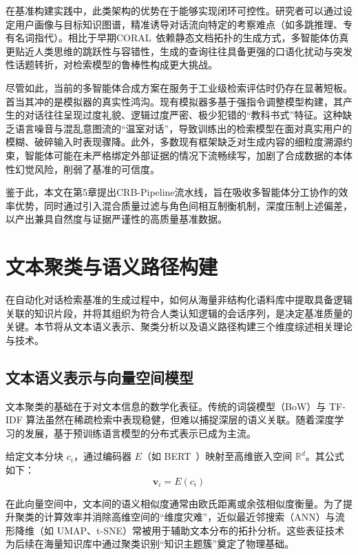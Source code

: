 在基准构建实践中，此类架构的优势在于能够实现闭环可控性。研究者可以通过设定用户画像与目标知识图谱，精准诱导对话流向特定的考察难点（如多跳推理、专有名词指代）。相比于早期CORAL~\citep{coral2025}依赖静态文档拓扑的生成方式，多智能体仿真更贴近人类思维的跳跃性与容错性，生成的查询往往具备更强的口语化扰动与突发性话题转折，对检索模型的鲁棒性构成更大挑战。

尽管如此，当前的多智能体合成方案在服务于工业级检索评估时仍存在显著短板。首当其冲的是模拟器的真实性鸿沟。现有模拟器多基于强指令调整模型构建，其产生的对话往往呈现过度礼貌、逻辑过度严密、极少犯错的“教科书式”特征。这种缺乏语言噪音与混乱意图流的“温室对话”，导致训练出的检索模型在面对真实用户的模糊、破碎输入时表现骤降。此外，多数现有框架缺乏对生成内容的细粒度溯源约束，智能体可能在未严格绑定外部证据的情况下流畅续写，加剧了合成数据的本体性幻觉风险，削弱了基准的可信度。

鉴于此，本文在第5章提出CRB-Pipeline流水线，旨在吸收多智能体分工协作的效率优势，同时通过引入混合质量过滤与角色间相互制衡机制，深度压制上述偏差，以产出兼具自然度与证据严谨性的高质量基准数据。



\section{文本聚类与语义路径构建}

在自动化对话检索基准的生成过程中，如何从海量非结构化语料库中提取具备逻辑关联的知识片段，并将其组织为符合人类认知逻辑的会话序列，是决定基准质量的关键。本节将从文本语义表示、聚类分析以及语义路径构建三个维度综述相关理论与技术。

\subsection{文本语义表示与向量空间模型}

文本聚类的基础在于对文本信息的数学化表征。传统的词袋模型（BoW）与 TF-IDF 算法虽然在稀疏检索中表现稳健，但难以捕捉深层的语义关联。随着深度学习的发展，基于预训练语言模型的分布式表示已成为主流。

给定文本分块 $c_i$，通过编码器 $E$（如 BERT~\citep{devlin2019bert}）映射至高维嵌入空间 $\mathbb{R}^d$。其公式如下：
\begin{equation}
    \mathbf{v}_i = E(c_i)
\end{equation}

在此向量空间中，文本间的语义相似度通常由欧氏距离或余弦相似度衡量。为了提升聚类的计算效率并消除高维空间的“维度灾难”，近似最近邻搜索（ANN）与流形降维（如 UMAP、t-SNE）常被用于辅助文本分布的拓扑分析。这些表征技术为后续在海量知识库中通过聚类识别“知识主题簇”奠定了物理基础。

